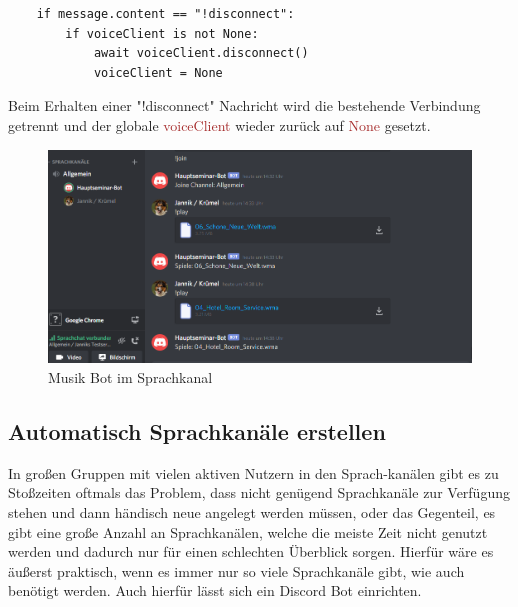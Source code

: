 \documentclass[sigplan,screen]{acmart}
\begin{document}
\begin{lstlisting}
    if message.content == "!disconnect":
        if voiceClient is not None:
            await voiceClient.disconnect()
            voiceClient = None
\end{lstlisting} 
Beim Erhalten einer "!disconnect" Nachricht wird die bestehende Verbindung getrennt und der globale \textcolor{brown}{voiceClient} wieder zurück auf \textcolor{brown}{None} gesetzt.


\begin{figure}[h]
  \centering
  \includegraphics[width=\linewidth]{discord_musik}
  \caption{Musik Bot im Sprachkanal}
\end{figure}

\subsection{Automatisch Sprachkanäle erstellen}
In großen Gruppen mit vielen aktiven Nutzern in den Sprach-kanälen gibt es zu Stoßzeiten oftmals das Problem, dass nicht genügend Sprachkanäle zur Verfügung stehen und dann händisch neue angelegt werden müssen, oder das Gegenteil, es gibt eine große Anzahl an Sprachkanälen, welche die meiste Zeit nicht genutzt werden und dadurch nur für einen schlechten Überblick sorgen. Hierfür wäre es äußerst praktisch, wenn es immer nur so viele Sprachkanäle gibt, wie auch benötigt werden. Auch hierfür lässt sich ein Discord Bot einrichten.
\end{document}
